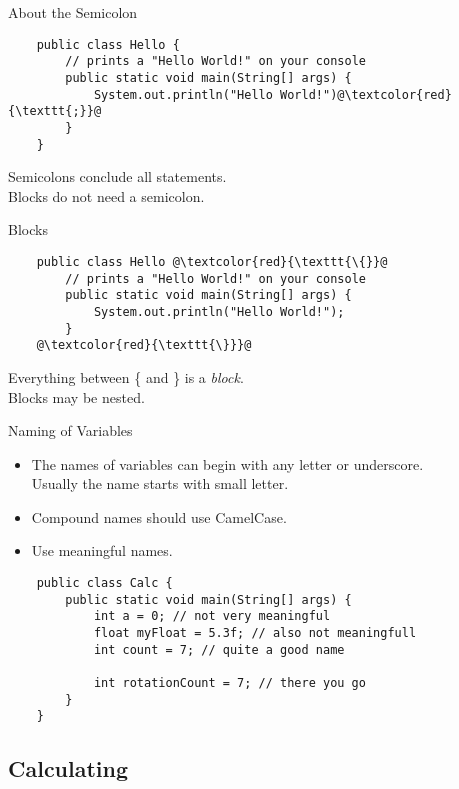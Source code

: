\begin{frame}[fragile]{About the Semicolon}
	\begin{lstlisting}
	public class Hello {
	    // prints a "Hello World!" on your console
	    public static void main(String[] args) {
	        System.out.println("Hello World!")@\textcolor{red}{\texttt{;}}@
	    }
	}
	\end{lstlisting}
	Semicolons conclude all statements. \\
	Blocks do not need a semicolon.
\end{frame}

\begin{frame}[fragile]{Blocks}
	\begin{lstlisting}
	public class Hello @\textcolor{red}{\texttt{\{}}@
	    // prints a "Hello World!" on your console
	    public static void main(String[] args) {
	        System.out.println("Hello World!");
	    }
	@\textcolor{red}{\texttt{\}}}@
	\end{lstlisting}
	Everything between \{ and \} is a \emph{block}. \\
	Blocks may be nested.
\end{frame}

\begin{frame}[fragile]{Naming of Variables}
	\begin{itemize}
		\item The names of variables can begin with any letter or underscore. \\
		Usually the name starts with small letter.
		\item Compound names should use CamelCase.
		\item Use meaningful names.
	\end{itemize}
	\begin{lstlisting}
	public class Calc {
	    public static void main(String[] args) {
	    	int a = 0; // not very meaningful
	    	float myFloat = 5.3f; // also not meaningfull
	    	int count = 7; // quite a good name

	    	int rotationCount = 7; // there you go
	    }
	}
	\end{lstlisting}
\end{frame}

\subsection{Calculating}

